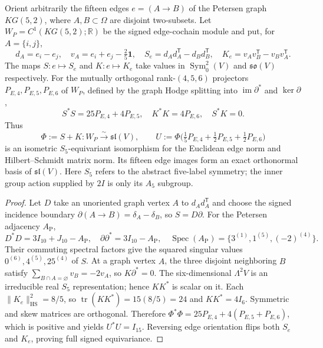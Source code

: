 \documentclass[11pt]{article}
\begin{document}
\begin{theorem}
\label{p1:thm:v339-petersen-sl4-isometry}
Orient arbitrarily the fifteen edges $e=(A\to B)$ of the
Petersen graph $KG(5,2)$, where $A,B\subset\Omega$ are disjoint
two-subsets. Let $W_P=C^1(KG(5,2);\mathbb R)$ be the signed
edge-cochain module and put, for $A=\{i,j\}$,
\[
 d_A=e_i-e_j,\quad v_A=e_i+e_j-\tfrac25\mathbf1,\quad
 S_e=d_Ad_A^{\mathsf T}-d_Bd_B^{\mathsf T},\quad
 K_e=v_Av_B^{\mathsf T}-v_Bv_A^{\mathsf T}.
\]
The maps $S:e\mapsto S_e$ and $K:e\mapsto K_e$ take values in
$\operatorname{Sym}^2_0(V)$ and $\mathfrak{so}(V)$ respectively.
For the mutually orthogonal rank-$(4,5,6)$ projectors
$P_{E,4},P_{E,5},P_{E,6}$ of $W_P$, defined by the graph Hodge
splitting into $\operatorname{im}\partial^*$ and $\ker\partial$,
\[
 S^*S=25P_{E,4}+4P_{E,5},\quad
 K^*K=4P_{E,6},\quad S^*K=0.
\]
Thus
\[
 \Phi:=S+K:W_P\xrightarrow{\sim}\mathfrak{sl}(V),\qquad
 U:=\Phi\bigl(\tfrac15P_{E,4}+\tfrac12P_{E,5}
                       +\tfrac12P_{E,6}\bigr)
\]
is an isometric $S_5$-equivariant isomorphism for the Euclidean
edge norm and Hilbert--Schmidt matrix norm. Its fifteen edge
images form an exact orthonormal basis of $\mathfrak{sl}(V)$.
Here $S_5$ refers to the abstract five-label symmetry; the
inner group action supplied by $2I$ is only its $A_5$ subgroup.
\end{theorem}
\begin{proof}
Let $D$ take an unoriented graph vertex $A$ to $d_Ad_A^\mathsf T$
and choose the signed incidence boundary
$\partial(A\to B)=\delta_A-\delta_B$, so $S=D\partial$.
For the Petersen adjacency $A_{\mathrm P}$,
\[
 D^*D=3I_{10}+J_{10}-A_{\mathrm P},\quad
 \partial\partial^*=3I_{10}-A_{\mathrm P},\quad
 \operatorname{Spec}(A_{\mathrm P})=\{3^{(1)},1^{(5)},(-2)^{(4)}\}.
\]
Their commuting spectral factors give the squared singular values
$0^{(6)},4^{(5)},25^{(4)}$ of $S$. At a graph vertex $A$, the
three disjoint neighboring $B$ satisfy $\sum_{B\cap A=\varnothing}v_B=-2v_A$,
so $K\partial^*=0$. The six-dimensional $\Lambda^2V$ is an
irreducible real $S_5$ representation; hence $KK^*$ is scalar
on it. Each $\|K_e\|_{\mathrm{HS}}^2=8/5$, so
$\operatorname{tr}(KK^*)=15(8/5)=24$ and $KK^*=4I_6$.
Symmetric and skew matrices are orthogonal. Therefore
$\Phi^*\Phi=25P_{E,4}+4(P_{E,5}+P_{E,6})$, which is positive
and yields $U^*U=I_{15}$. Reversing edge orientation flips
both $S_e$ and $K_e$, proving full signed equivariance.
\end{proof}
\end{document}
